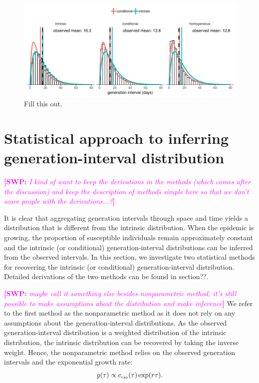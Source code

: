 \documentclass[12pt]{article}
\newcommand{\tsub}[2]{#1_{{\textrm{\tiny #2}}}}
\newcommand{\comment}[3]{\textcolor{#1}{\textbf{[#2: }\textsl{#3}\textbf{]}}}
\newcommand{\swp}[1]{\comment{magenta}{SWP}{#1}}
\begin{document}
\begin{figure}
\includegraphics[width=\textwidth]{../fig/local_effect.pdf}
\caption{Fill this out.}
\label{fig:local}
\end{figure}

\section{Statistical approach to inferring generation-interval distribution}

\swp{I kind of want to keep the derivations in the methods (which comes after the discussion) and keep the description of methods simple here so that we don't scare people with the derivations...?}

It is clear that aggregating generation intervals through space and time yields a distribution that is different from the intrinsic distribution.
When the epidemic is growing, the proportion of susceptible individuals remain approximately constant and the intrinsic (or conditional) generation-interval distributions can be inferred from the observed intervals.
In this section, we investigate two statistical methods for recovering the intrinsic (or conditional) generation-interval distribution.
Detailed derivations of the two methods can be found in section??.

\swp{maybe call it something else besides nonparametric method; it's still possible to make assumptions about the distribution and make inference}
We refer to the first method as the nonparametric method as it does not rely on any assumptions about the generation-interval distributions.
As the observed generation-interval distribution is a weighted distribution of the intrinsic distribution, the intrinsic distribution can be recovered by taking the inverse weight.
Hence, the nonparametric method relies on the observed generation intervals and the exponential growth rate:
\begin{equation}
g(\tau) \propto \tsub{c}{exp}(\tau) \exp(r\tau).
\end{equation}
\end{document}
